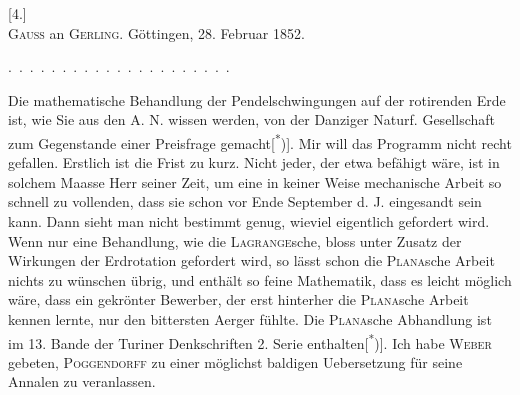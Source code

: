 \clearpage\begingroup{}
\begin{center}
[4.]\\[.7em]
\textsc{Gauss} an \textsc{Gerling}. Göttingen, 28. Februar 1852.
\end{center}
\noindent .\ .\ .\ .\ .\ .\ .\ .\ .\ .\ .\ .\ .\ .\ .\ .\ .\ .\ .\ .\ .
\par\noindent\hspace*{\parindent}Die mathematische Behandlung der Pendelschwingungen auf der rotirenden
Erde ist, wie Sie aus den A. N. wissen werden, von der Danziger Naturf. Gesellschaft
zum Gegenstande einer Preisfrage gemacht[\textsuperscript{*})]\begingroup\renewcommand{\thefootnote}{}\endgroup. Mir will das Programm
nicht recht gefallen. Erstlich ist die Frist zu kurz. Nicht jeder, der etwa
befähigt wäre, ist in solchem Maasse Herr seiner Zeit, um eine in keiner
Weise mechanische Arbeit so schnell zu vollenden, dass sie schon vor Ende
September d. J. eingesandt sein kann. Dann sieht man nicht bestimmt genug,
wieviel eigentlich gefordert wird. Wenn nur eine Behandlung, wie die \textsc{Lagrange}sche,
bloss unter Zusatz der Wirkungen der Erdrotation gefordert wird,
so lässt schon die \textsc{Plana}sche Arbeit nichts zu wünschen übrig, und enthält
so feine Mathematik, dass es leicht möglich wäre, dass ein gekrönter Bewerber,
der erst hinterher die \textsc{Plana}sche Arbeit kennen lernte, nur den
bittersten Aerger fühlte. Die \textsc{Plana}sche Abhandlung ist im 13. Bande der
\clearpage{}
\noindent Turiner Denkschriften 2. Serie enthalten[\textsuperscript{*})]\begingroup\renewcommand{\thefootnote}{}\endgroup. Ich habe \textsc{Weber} gebeten,
\textsc{Poggendorff} zu einer möglichst baldigen Uebersetzung für seine Annalen zu
veranlassen.

